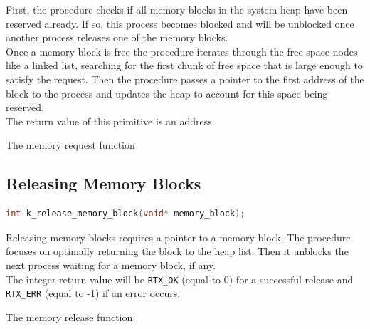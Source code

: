 \documentclass[12pt]{report}
\begin{document}
First, the procedure checks if all memory blocks in the system heap have been reserved already. If so, this process becomes blocked and will be unblocked once another process releases one of the memory blocks. \\
Once a memory block is free the procedure iterates through the free space nodes like a linked list, searching for the first chunk of free space that is large enough to satisfy the request. Then the procedure passes a pointer to the first address of the block to the process and updates the heap to account for this space being reserved. \\
The return value of this primitive is an address.

\begin{algorithm}
  \caption{The memory request function}
  \begin{algorithmic}[1]
	  \EndWhile
    \EndProcedure
  \end{algorithmic}
\end{algorithm}

\subsection{Releasing Memory Blocks}

\begin{minipage}{\textwidth}
\begin{lstlisting}[language=C, frame=single]
int k_release_memory_block(void* memory_block);
\end{lstlisting}
\end{minipage}

Releasing memory blocks requires a pointer to a memory block. The procedure focuses on optimally returning the block to the heap list. Then it unblocks the next process waiting for a memory block, if any.\\

The integer return value will be {\tt RTX\_OK} (equal to 0) for a successful release and {\tt RTX\_ERR} (equal to -1) if an error occurs.\\

\begin{algorithm}
  \caption{The memory release function}
  \begin{algorithmic}[1]
	  \EndIf
	  \EndIf
	  \EndIf
	  \EndIf
    \EndProcedure
  \end{algorithmic}
\end{algorithm}
\end{document}
